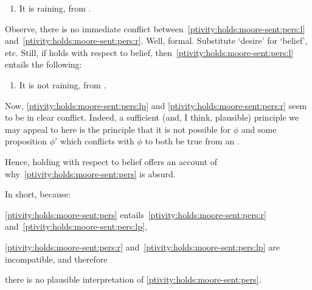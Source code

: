 \begin{note}
  \begin{enumerate}[label=\emph{M\('\)\textsubscript{r}}., ref=(\emph{M\('\)\textsubscript{r}})]
  \item
    \label{ptivity:holds:moore-sent:pers:r}
    It is raining, from .
  \end{enumerate}

  Observe, there is no immediate conflict between~\ref{ptivity:holds:moore-sent:pers:l} and~\ref{ptivity:holds:moore-sent:pers:r}.
  {
    \color{red}
    Well, formal.
    Substitute `desire' for `belief', etc.
  }
  Still, if \ptivity{} holds with respect to belief, then~\ref{ptivity:holds:moore-sent:pers:l} entails the following:

  \begin{enumerate}[label=\emph{M\('\)\textsubscript{l\('\)}}., ref=(\emph{M\('\)\textsubscript{l\('\)}})]
  \item
    \label{ptivity:holds:moore-sent:pers:lp}
    It is not raining, from .
  \end{enumerate}

  Now, \ref{ptivity:holds:moore-sent:pers:lp} and \ref{ptivity:holds:moore-sent:pers:r} seem to be in clear conflict.
  Indeed, a sufficient (and, I think, plausible) principle we may appeal to here is the principle that it is not possible for \(\phi\) and some proposition \(\phi'\) which conflicts with \(\phi\) to both be true from an \agpe{}.

  Hence, \ptivity{} holding with respect to belief offers an account of why~\ref{ptivity:holds:moore-sent:pers} is absurd.

  In short, because:
  \begin{enumerate*}[label=(\roman*)]
  \item
    \ref{ptivity:holds:moore-sent:pers} entails~\ref{ptivity:holds:moore-sent:pers:r} and~\ref{ptivity:holds:moore-sent:pers:lp},
  \item
    \ref{ptivity:holds:moore-sent:pers:r} and~\ref{ptivity:holds:moore-sent:pers:lp} are incompatible, and therefore
  \item
    there is no plausible interpretation of \ref{ptivity:holds:moore-sent:pers}.
  \end{enumerate*}
\end{note}

